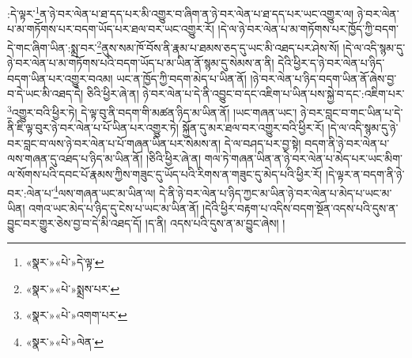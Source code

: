 :དེ་ལྟར་\footnote{«སྣར་»«པེ་»དེ་ལྟ་}ན་ཉེ་བར་ལེན་པ་ཐ་དད་པར་མི་འགྱུར་བ་ཞིག་ན་ཉེ་བར་ལེན་པ་ཐ་དད་པར་ཡང་འགྱུར་ལ། ཉེ་བར་ལེན་པ་མ་གཏོགས་པར་བདག་ཡོད་པར་ཐལ་བར་ཡང་འགྱུར་རོ། །དེ་ལ་ཉེ་བར་ལེན་པ་མ་གཏོགས་པར་ཁྱོད་ཀྱི་བདག་དེ་གང་ཞིག་ཡིན་:སྨྲ་བར་\footnote{«སྣར་»«པེ་»སྨྲས་པར་}ནུས་སམ་ཁོ་བོས་ནི་རྣམ་པ་ཐམས་ཅད་དུ་ཡང་མི་འཐད་པར་ཤེས་སོ། །དེ་ལ་འདི་སྙམ་དུ་ཉེ་བར་ལེན་པ་མ་གཏོགས་པའི་བདག་ཡོད་པ་མ་ཡིན་ནོ་སྙམ་དུ་སེམས་ན་ནི། དེའི་ཕྱིར་ད་ཉེ་བར་ལེན་པ་ཉིད་བདག་ཡིན་པར་འགྱུར་བའམ། ཡང་ན་ཁྱོད་ཀྱི་བདག་མེད་པ་ཡིན་ནོ། །ཉེ་བར་ལེན་པ་ཉིད་བདག་ཡིན་ནོ་ཞེས་བྱ་བ་དེ་ཡང་མི་འཐད་དེ། ཅིའི་ཕྱིར་ཞེ་ན། ཉེ་བར་ལེན་པ་དེ་ནི་འབྱུང་བ་དང་འཇིག་པ་ཡིན་པས་སྐྱེ་བ་དང་:འཇིག་པར་\footnote{«སྣར་»«པེ་»འགག་པར་}འགྱུར་བའི་ཕྱིར་ཏེ། དེ་ལྟ་བུ་ནི་བདག་གི་མཚན་ཉིད་མ་ཡིན་ནོ། །ཡང་གཞན་ཡང་། ཉེ་བར་བླང་བ་གང་ཡིན་པ་དེ་ནི་ཇི་ལྟ་བུར་ཉེ་བར་ལེན་པ་པོ་ཡིན་པར་འགྱུར་ཏེ། སྐྱོན་དུ་མར་ཐལ་བར་འགྱུར་བའི་ཕྱིར་རོ། །དེ་ལ་འདི་སྙམ་དུ་ཉེ་བར་བླང་བ་ལས་ཉེ་བར་ལེན་པ་པོ་གཞན་ཡིན་པར་སེམས་ན། དེ་ལ་བཤད་པར་བྱ་སྟེ། བདག་ནི་ཉེ་བར་ལེན་པ་ལས་གཞན་དུ་འཐད་པ་ཉིད་མ་ཡིན་ནོ། །ཅིའི་ཕྱིར་ཞེ་ན། གལ་ཏེ་གཞན་ཡིན་ན་ཉེ་བར་ལེན་པ་མེད་པར་ཡང་མིག་ལ་སོགས་པའི་དབང་པོ་རྣམས་ཀྱིས་གཟུང་དུ་ཡོད་པའི་རིགས་ན་གཟུང་དུ་མེད་པའི་ཕྱིར་རོ། །དེ་ལྟར་ན་བདག་ནི་ཉེ་བར་:ལེན་པ་\footnote{«སྣར་»«པེ་»ལེན་}ལས་གཞན་ཡང་མ་ཡིན་ལ། དེ་ནི་ཉེ་བར་ལེན་པ་ཉིད་ཀྱང་མ་ཡིན་ཉེ་བར་ལེན་པ་མེད་པ་ཡང་མ་ཡིན། འགའ་ཡང་མེད་པ་ཉིད་དུ་ངེས་པ་ཡང་མ་ཡིན་ནོ། །དེའི་ཕྱིར་བརྟག་པ་འདིས་བདག་སྔོན་འདས་པའི་དུས་ན་བྱུང་བར་གྱུར་ཅེས་བྱ་བ་དེ་མི་འཐད་དོ། །ད་ནི། འདས་པའི་དུས་ན་མ་བྱུང་ཞེས། །
